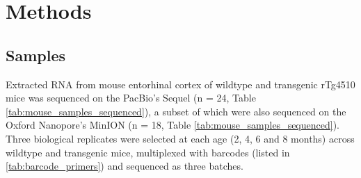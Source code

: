 

\section{Methods}

\subsection{Samples}
Extracted RNA from mouse entorhinal cortex of wildtype and transgenic rTg4510 mice was sequenced on the PacBio's Sequel (n = 24, Table \ref{tab:mouse_samples_sequenced}), a subset of which were also sequenced on the Oxford Nanopore's MinION (n = 18, Table \ref{tab:mouse_samples_sequenced}). Three biological replicates were selected at each age (2, 4, 6 and 8 months) across wildtype and transgenic mice, multiplexed with barcodes (listed in \cref{tab:barcode_primers}) and sequenced as three batches.

